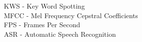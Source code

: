 KWS - Key Word Spotting\\
MFCC - Mel Frequency Cepstral Coefficients\\
FPS - Frames Per Second\\
ASR - Automatic Speech Recognition\\